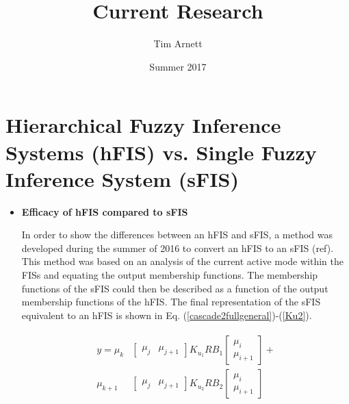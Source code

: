 \documentclass[11pt]{article} %
\title{Current Research}
\author{Tim Arnett}
\date{Summer 2017} %
\begin{document}
\maketitle

\tableofcontents

\section{Hierarchical Fuzzy Inference Systems (hFIS) vs. Single Fuzzy Inference System (sFIS)}
\begin{itemize}
\item \textbf{Efficacy of hFIS compared to sFIS}

In order to show the differences between an hFIS and sFIS, a method was developed during the summer of 2016 to convert an hFIS to an sFIS (ref). This method was based on an analysis of the current active mode within the FISs and equating the output membership functions. The membership functions of the sFIS could then be described as a function of the output membership functions of the hFIS. The final representation of the sFIS equivalent to an hFIS is shown in Eq. (\ref{cascade2fullgeneral})-(\ref{Ku2}).

\begin{align}\label{cascade2fullgeneral}
\begin{split}
y = \mu_{k}&\left[ \begin{array}{cc}
\mu_{j} & \mu_{j+1}
\end{array} \right] 
K_{u_{1}} RB_1
\left[ \begin{array}{cc}
\mu_{i} \\
\mu_{i+1}
\end{array} \right]+\\
\mu_{k+1}&\left[ \begin{array}{cc}
\mu_{j} & \mu_{j+1}
\end{array} \right] 
K_{u_{2}} RB_2 
\left[ \begin{array}{cc}
\mu_{i} \\
\mu_{i+1}
\end{array} \right]
\end{split}
\end{align}


\end{itemize}
\end{document}
